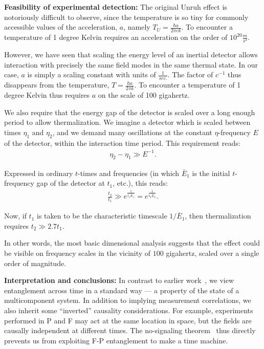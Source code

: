 \documentclass[aps,prl,showpacs,12pt]{revtex4}
\begin{document}
\textbf{Feasibility of experimental detection:}  The original Unruh effect is notoriously difficult to observe, since the temperature is so tiny for commonly accessible values of the acceleration, $a$, namely $T_{U} = \frac{\hbar a}{2 \pi c k}$.  To encounter a temperature of 1 degree Kelvin requires an acceleration on the order of $10^{20} \frac{m}{s^{2}}$.

However, we have seen that scaling the energy level of an inertial detector allows interaction with precisely the same field modes in the same thermal state.  In our case, $a$ is simply a scaling constant with units of $\frac{1}{sec.}$.  The factor of $c^{-1}$ thus disappears from the temperature, $T = \frac{\hbar a}{2 \pi k}$.  To encounter a temperature of 1 degree Kelvin thus requires $a$ on the scale of 100 gigahertz.

We also require that the energy gap of the detector is scaled over a long enough period to allow thermalization.  We imagine a detector which is scaled between times $\eta_{1}$ and $\eta_{2}$, and we demand many oscillations at the constant $\eta$-frequency $E$ of the detector, within the interaction time period.  This requirement reads:
\begin{eqnarray*}
\eta_{2} - \eta_{1} \gg E^{-1}.
\end{eqnarray*}

Expressed in ordinary $t$-times and frequencies (in which $\bar{E}_{1}$ is the initial $t$-frequency gap of the detector at $t_{1}$, etc.), this reads:
\begin{eqnarray*}
\frac{t_{2}}{t_{1}} \gg e^{\frac{1}{t_{1} \bar{E}_{1}}} = e^{\frac{1}{t_{2} \bar{E}_{2}}}.
\end{eqnarray*}

Now, if $t_{1}$ is taken to be the characteristic timescale $1/\bar{E}_{1}$, then thermalization requires $t_{2}  \gg 2.7 t_{1}$.

In other words, the most basic dimensional analysis suggests that the effect could be visible on frequency scales in the vicinity of $100$ gigahertz, scaled over a single order of magnitude.

\textbf{Interpretation and conclusions:} In contrast to earlier work~\cite{vedral1}, we view entanglement across time in a standard way \---- a property of the state of a multicomponent system.  In addition to implying measurement correlations, we also inherit some ``inverted'' causality considerations.  For example, experiments performed in P and F may act at the same location in space, but the fields are causally independent at different times.  The no-signaling theorem~\cite{ghirardi1} thus directly prevents us from exploiting F-P entanglement to make a time machine.
\end{document}
